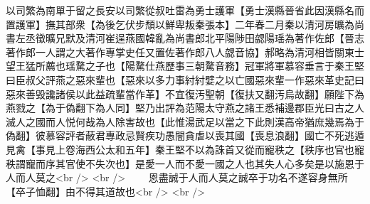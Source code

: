 以司繁為南單于留之長安以司繁從叔吐雷為勇士護軍【勇士漢縣晉省此因漢縣名而置護軍】撫其部衆【為後乞伏步頹以鮮卑叛秦張本】二年春二月秦以清河房曠為尚書左丞徵曠兄默及清河崔逞燕國韓亂為尚書郎北平陽陟田勰陽瑶為著作佐郎【晉志著作郎一人謂之大著作專掌史任又置佐著作郎八人勰音協】郝略為清河相皆關東士望王猛所薦也瑶騖之子也【陽騖仕燕歷事三朝騖音務】冠軍將軍慕容垂言于秦王堅曰臣叔父評燕之惡來輩也【惡來以多力事紂紂嬖之以亡國惡來輩一作惡來革史記曰惡來善毁讒諸侯以此益疏輩當作革】不宜復汚聖朝【復扶又翻汚烏故翻】願陛下為燕戮之【為于偽翻下為人同】堅乃出評為范陽太守燕之諸王悉補邊郡臣光曰古之人滅人之國而人悦何哉為人除害故也【此惟湯武足以當之下此則漢高帝猶庶幾焉為于偽翻】彼慕容評者蔽君專政忌賢疾功愚闇貪虐以喪其國【喪息浪翻】國亡不死逃遁見禽【事見上卷海西公太和五年】秦王堅不以為誅首又從而寵秩之【秩序也官也寵秩謂寵而序其官使不失次也】是愛一人而不愛一國之人也其失人心多矣是以施恩于人而人莫之<br />
<br />
　　恩盡誠于人而人莫之誠卒于功名不遂容身無所【卒子恤翻】由不得其道故也<br />
<br />

